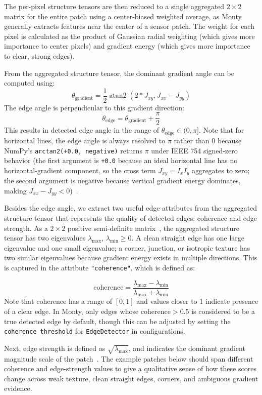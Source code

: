 \documentclass{article}
\begin{document}
The per-pixel structure tensors are then reduced to a single aggregated $2 \times 2$ matrix for the entire patch using a center-biased weighted average, as Monty generally extracts features near the center of a sensor patch.
The weight for each pixel is calculated as the product of Gaussian radial weighting (which gives more importance to center pixels) and gradient energy (which gives more importance to clear, strong edges).

From the aggregated structure tensor, the dominant gradient angle can be computed using:
\[
  \theta_\text{gradient} =
    \frac{1}{2}
    \operatorname{atan2}(2 * J_{xy}, J_{xx} - J_{yy})
\]
The edge angle is perpendicular to this gradient direction:
\[
  \theta_\text{edge} = \theta_\text{gradient} + \frac{\pi}{2}
\]
This results in detected edge angle in the range of $\theta_\text{edge} \in (0, \pi]$. Note that for horizontal lines, the edge angle is always resolved to $\pi$ rather than $0$ because NumPy's \texttt{arctan2(+0.0, negative)} returns $\pi$ under IEEE 754 signed-zero behavior (the first argument is \texttt{+0.0} because an ideal horizontal line has no horizontal-gradient component, so the cross term $J_{xy}=I_x I_y$ aggregates to zero; the second argument is negative because vertical gradient energy dominates, making $J_{xx} - J_{yy} < 0$)~\cite{numpy_arctan2}.

Besides the edge angle, we extract two useful edge attributes from the aggregated structure tensor that represents the quality of detected edges: coherence and edge strength. As a $2 \times 2$ positive semi-definite matrix~\cite{wikipedia_definite_matrix}, the aggregated structure tensor has two eigenvalues $\lambda_{\max}$, $\lambda_{\min} \geq 0$.
A clean straight edge has one large eigenvalue and one small eigenvalue; a corner, junction, or isotropic texture has two similar eigenvalues because gradient energy exists in multiple directions. This is captured in the attribute \texttt{"coherence"}, which is defined as:

\[
  \text{coherence} = \frac{\lambda_{\max} - \lambda_{\min}}
       {\lambda_{\max} + \lambda_{\min}}
\]
Note that coherence has a range of $[0, 1]$ and values closer to 1 indicate presence of a clear edge. In Monty, only edges whose $\text{coherence} > 0.5$ is considered to be a true detected edge by default, though this can be adjusted by setting the \texttt{coherence\_threshold} for \texttt{EdgeDetector} in configurations.

Next, edge strength is defined as $\sqrt{\lambda_{\max}}$, and indicates the dominant gradient magnitude scale of the patch~\cite{khan_corner_detection,opencv_gst}. The example patches below should span different coherence and edge-strength values to give a qualitative sense of how these scores change across weak texture, clean straight edges, corners, and ambiguous gradient evidence.
\end{document}

